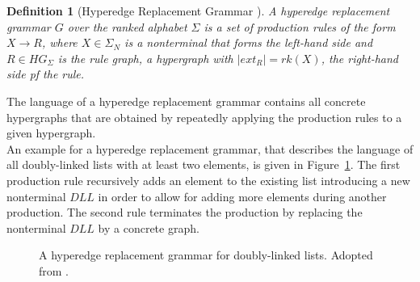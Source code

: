 \documentclass[a4paper, 12pt, twoside]{report}
\theoremstyle{plain}
\newtheorem{definition}[theorem]{Definition}
\begin{document}
	\begin{definition}[Hyperedge Replacement Grammar \cite{heinen2015verifyingPhd}]\label{def:hrg}
		A \textup{hyperedge replacement grammar} $G$ over the ranked alphabet $\Sigma$ is a set of production rules of the form $X \rightarrow R$, where $X \in \Sigma_N$ is a nonterminal that forms the left-hand
		side and $R \in HG_{\Sigma}$ is the rule graph, a hypergraph with $|ext_R|=rk(X)$, the right-hand side pf the rule.
	\end{definition}

	The language of a hyperedge replacement grammar contains all concrete hypergraphs that are obtained by repeatedly applying the production rules to a given hypergraph.\\
	
	An example for a hyperedge replacement grammar, that describes the language of all doubly-linked lists with at least two elements, is given in Figure~\ref{fig:dll_grammar}. The first production rule recursively adds an element to the existing list introducing a new nonterminal $DLL$ in order to allow for adding more elements during another production. The second rule terminates the production by replacing the nonterminal $DLL$ by a concrete graph. 
	
	\begin{figure}[!h]
		\begin{center}
			\caption{A hyperedge replacement grammar for doubly-linked lists. Adopted from \cite{heinen2015verifying}.}\label{fig:dll_grammar}
		\end{center}
	\end{figure}
\end{document}
